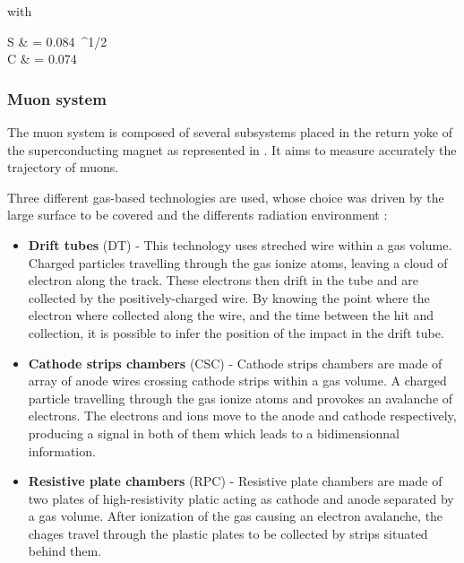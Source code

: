         with

        {
            S & = 0.084~^{1/2} \\
            C & = 0.074\nonumber
        }

            \subsubsection{Muon system}

        The muon system is composed of several subsystems placed in the return yoke of
        the superconducting magnet as represented in . It aims to
        measure accurately the trajectory of muons.


        Three different gas-based technologies are used, whose choice was driven by the
        large surface to be covered and the differents radiation environment :
        \begin{itemize}
            \item \textbf{Drift tubes} (DT) - This technology uses streched wire within
                a gas volume. Charged particles travelling through the gas ionize atoms,
                leaving a cloud of electron along the track. These electrons then drift
                in the tube and are collected by the positively-charged wire. By knowing
                the point where the electron where collected along the wire, and the
                time between the hit and collection, it is possible to infer the position
                of the impact in the drift tube.
            \item \textbf{Cathode strips chambers} (CSC) - Cathode strips chambers are
                made of array of anode wires crossing cathode strips within a gas volume.
                A charged particle travelling through the gas ionize atoms and provokes an
                avalanche of electrons. The electrons and ions move to the anode and
                cathode respectively, producing a signal in both of them which leads to
                a bidimensionnal information.
            \item \textbf{Resistive plate chambers} (RPC) - Resistive plate chambers are
                made of two plates of high-resistivity platic acting as cathode and anode
                separated by a gas volume. After ionization of the gas causing an
                electron avalanche, the chages travel through the plastic plates to be
                collected by strips situated behind them.
        \end{itemize}

